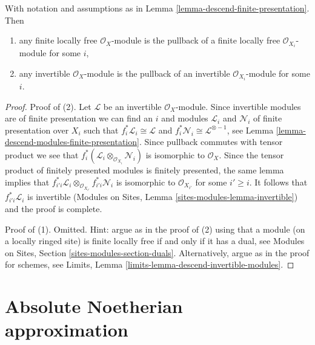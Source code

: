 \begin{lemma}
\label{lemma-descend-invertible-modules}
With notation and assumptions as in
Lemma \ref{lemma-descend-finite-presentation}. Then
\begin{enumerate}
\item any finite locally free $\mathcal{O}_X$-module is the pullback
of a finite locally free $\mathcal{O}_{X_i}$-module for some $i$,
\item any invertible $\mathcal{O}_X$-module is the pullback of an invertible
$\mathcal{O}_{X_i}$-module for some $i$.
\end{enumerate}
\end{lemma}

\begin{proof}
Proof of (2).
Let $\mathcal{L}$ be an invertible $\mathcal{O}_X$-module. Since
invertible modules are of finite presentation we can find an $i$
and modules $\mathcal{L}_i$ and $\mathcal{N}_i$ of finite presentation
over $X_i$ such that $f_i^*\mathcal{L}_i \cong \mathcal{L}$ and
$f_i^*\mathcal{N}_i \cong \mathcal{L}^{\otimes -1}$, see
Lemma \ref{lemma-descend-modules-finite-presentation}.
Since pullback commutes with tensor product we see that
$f_i^*(\mathcal{L}_i \otimes_{\mathcal{O}_{X_i}} \mathcal{N}_i)$
is isomorphic to $\mathcal{O}_X$. Since the tensor product of
finitely presented modules is finitely presented, the same
lemma implies that
$f_{i'i}^*\mathcal{L}_i
\otimes_{\mathcal{O}_{X_{i'}}} f_{i'i}^*\mathcal{N}_i$
is isomorphic to $\mathcal{O}_{X_{i'}}$ for some $i' \geq i$.
It follows that $f_{i'i}^*\mathcal{L}_i$ is invertible
(Modules on Sites, Lemma \ref{sites-modules-lemma-invertible})
and the proof is complete.

\medskip\noindent
Proof of (1). Omitted. Hint: argue as in the proof of (2)
using that a module (on a locally ringed site) is finite locally free
if and only if it has a dual, see
Modules on Sites, Section \ref{sites-modules-section-duals}.
Alternatively, argue as in the proof for schemes, see
Limits, Lemma \ref{limits-lemma-descend-invertible-modules}.
\end{proof}














\section{Absolute Noetherian approximation}
\label{section-approximation}

